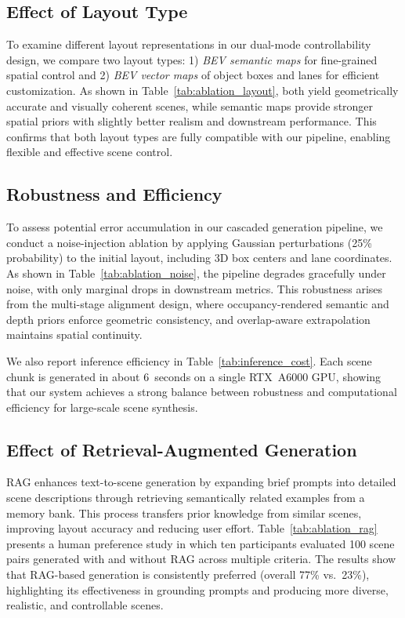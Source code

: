 \subsection{Effect of Layout Type}
To examine different layout representations in our dual-mode controllability design, we compare two layout types: 1) \textit{BEV semantic maps} for fine-grained spatial control and 2) \textit{BEV vector maps} of object boxes and lanes for efficient customization. As shown in Table~\ref{tab:ablation_layout}, both yield geometrically accurate and visually coherent scenes, while semantic maps provide stronger spatial priors with slightly better realism and downstream performance. This confirms that both layout types are fully compatible with our pipeline, enabling flexible and effective scene control.


\subsection{Robustness and Efficiency}
To assess potential error accumulation in our cascaded generation pipeline, we conduct a noise-injection ablation by applying Gaussian perturbations (25\% probability) to the initial layout, including 3D box centers and lane coordinates. As shown in Table~\ref{tab:ablation_noise}, the pipeline degrades gracefully under noise, with only marginal drops in downstream metrics. This robustness arises from the multi-stage alignment design, where occupancy-rendered semantic and depth priors enforce geometric consistency, and overlap-aware extrapolation maintains spatial continuity.

We also report inference efficiency in Table~\ref{tab:inference_cost}. Each scene chunk is generated in about 6~seconds on a single RTX~A6000 GPU, showing that our system achieves a strong balance between robustness and computational efficiency for large-scale scene synthesis.



\subsection{Effect of Retrieval-Augmented Generation}
RAG enhances text-to-scene generation by expanding brief prompts into detailed scene descriptions through retrieving semantically related examples from a memory bank. This process transfers prior knowledge from similar scenes, improving layout accuracy and reducing user effort. Table~\ref{tab:ablation_rag} presents a human preference study in which ten participants evaluated 100 scene pairs generated with and without RAG across multiple criteria. The results show that RAG-based generation is consistently preferred (overall 77\% vs.\ 23\%), highlighting its effectiveness in grounding prompts and producing more diverse, realistic, and controllable scenes.

